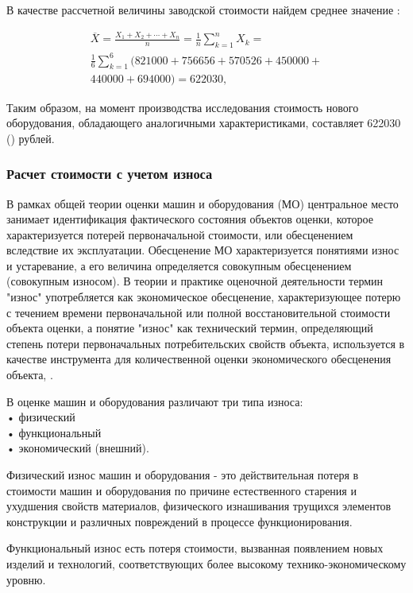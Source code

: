 В качестве рассчетной величины  заводской стоимости найдем среднее значение :

\begin{multline}
\label{AMean} 
	\overline{X} = \frac{X_1 + X_2 + \cdots +X_n }{n} =
\frac{1}{n} \sum\limits_{k=1}^{n} X_k = \\
\frac{1}{6} \sum\limits_{k=1}^{6}(821000+756656+570526+450000+ \\ 440000+694000) = 
	622030,  
\end{multline}

Таким образом, на момент производства исследования стоимость нового оборудования, обладающего аналогичными характеристиками, составляет 622030 () рублей.

\subsubsection{Расчет стоимости с учетом износа}

В рамках общей теории оценки машин и оборудования (МО) центральное место занимает идентификация фактического состояния объектов оценки, которое характеризуется потерей первоначальной стоимости, или обесценением вследствие их эксплуатации. Обесценение МО характеризуется понятиями износ и устаревание, а его величина определяется совокупным обесценением (совокупным износом). В теории и практике оценочной деятельности термин "износ" употребляется как экономическое обесценение, характеризующее потерю с течением времени первоначальной или полной восстановительной стоимости объекта оценки, а понятие "износ" как технический термин, определяющий степень потери первоначальных потребительских свойств объекта, используется в качестве инструмента для количественной оценки экономического обесценения объекта, \cite{kovalev:2006}.

В оценке машин и оборудования различают три типа износа:\\
• физический\\
• функциональный\\
• экономический (внешний).

Физический износ машин и оборудования - это действительная потеря в стоимости машин и оборудования по причине естественного старения и ухудшения свойств материалов, физического изнашивания трущихся элементов конструкции и различных повреждений в процессе функционирования.
 
Функциональный износ есть потеря стоимости, вызванная появлением
новых изделий и технологий, соответствующих более высокому технико-экономическому уровню.

